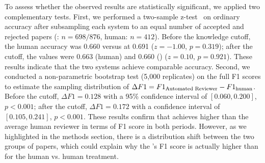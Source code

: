 \begin{appendices}
To assess whether the observed results are statistically significant, we applied two complementary tests.
First, we performed a two-sample z-test~\citep{lehmann1959ztest} on ordinary accuracy after subsampling each system to an equal number of accepted and rejected papers (\ourreviewer: $n = 698/876$, human: $n = 412$).
Before the knowledge cutoff, the human accuracy was 0.660 versus \ourreviewer at 0.691 ($z = -1.00$, $p = 0.319$); after the cutoff, the values were 0.663 (human) and 0.660 (\ourreviewer) ($z = 0.10$, $p = 0.921$).
These results indicate that the two systems achieve comparable accuracy.
Second, we conducted a non-parametric bootstrap test (5{,}000 replicates) on the full F1 scores to estimate the sampling distribution of $\Delta F1 = F1_{\text{Automated Reviewer}} - F1_{\text{human}}$.
Before the cutoff, $\Delta F1 = 0.128$ with a 95\% confidence interval of $[0.060, 0.200]$, $p < 0.001$; after the cutoff, $\Delta F1 = 0.172$ with a confidence interval of $[0.105, 0.241]$, $p < 0.001$.
These results confirm that \ourreviewer achieves higher than the average human reviewer in terms of F1 score in both periods.
However, as we highlighted in the methods section, there is a distribution shift between the two groups of papers, which could explain why the \ourreviewer's F1 score is actually higher than for the human vs. human treatment.


\end{appendices}
